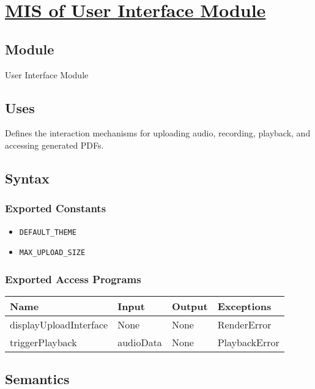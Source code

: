 \documentclass[12pt, titlepage]{article}
\begin{document}
\section{\hyperref[mUI]{MIS of User Interface Module}} \label{M2}  

\subsection{Module}  
User Interface Module  

\subsection{Uses}  
Defines the interaction mechanisms for uploading audio, recording, playback, and accessing generated PDFs.  

\subsection{Syntax}  

\subsubsection{Exported Constants}  
\begin{itemize}
    \item \texttt{DEFAULT\_THEME}  
    \item \texttt{MAX\_UPLOAD\_SIZE}  
\end{itemize}  

\subsubsection{Exported Access Programs}  
\begin{center}  
\begin{tabular}{|p{5cm}|p{2cm}|p{4cm}|p{3.5cm}|}  
\hline  
\textbf{Name} & \textbf{Input} & \textbf{Output} & \textbf{Exceptions} \\  
\hline  
displayUploadInterface & None & None & RenderError \\  
triggerPlayback & audioData & None & PlaybackError \\  
\hline  
\end{tabular}  
\end{center}  

\subsection{Semantics}  
\end{document}
